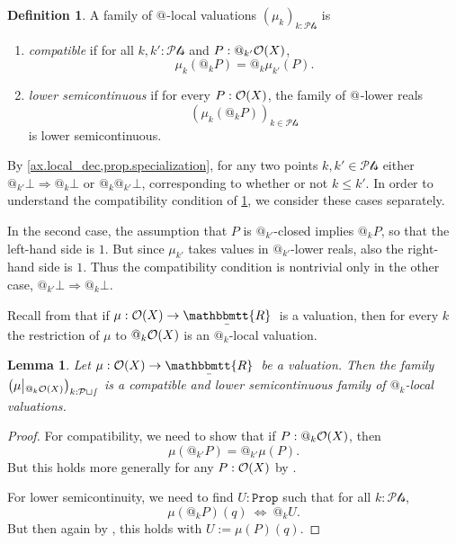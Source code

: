 \documentclass[11pt, oneside, article]{memoir}
\makeatletter
\theoremstyle{plain}
\newtheorem{lemma}[theorem]{Lemma}
\theoremstyle{definition}
\newtheorem{definition}[theorem]{Definition}
\theoremstyle{remark}
\newcommand{\const}[1]{\mathtt{#1}}
\newcommand{\ubar}[1]{\underaccent{\bar}{#1}}
\newcommand{\internal}[1]{\raisebox{-.03ex}{$\mathbbmtt{#1}$}}
\newcommand{\hs}{\hspace{1.1pt}}
\newcommand{\trr}{\internal{R}\hs}
\newcommand{\tlrr}{\ubar{\trr}\hs}
\newcommand{\prop}{\const{Prop}}
\newcommand{\Op}[1][undef]{\ifthenelse{\equal{#1}{undef}}{\mathcal{O}}{\mathcal{O}(#1)}}
\newcommand{\pt}{k}				%
\newcommand{\Pts}{\mathcal{Pts}}		%
\newcommand{\rest}[2]{#1\big|\hspace{0in}_{#2}}
\newcommand{\AtSymbol}{{@}}
\newcommand{\At}[1][\pt]{\AtSymbol_{#1}}
\newcommand{\imp}{\Rightarrow}
\newcommand{\false}{\bot}
\makeatother
\begin{document}
\begin{definition}\label{def.valuations_compatible_lowersemi}
	A family of $\At[]$-local valuations $(\mu_\pt)_{\pt : \Pts}$ is
	\begin{enumerate}
		\item \emph{compatible} if for all $\pt, \pt' : \Pts$ and $P : \At[\pt'] \Op[X]$,
			\[
				\mu_{\pt}(\At[\pt] P) = \At[\pt] \mu_{\pt'}(P).
			\]
		\item \emph{lower semicontinuous} if for every $P : \Op[X]$, the family of $\At[]$-lower reals
			\[
				\left( \mu_\pt(\At P) \right)_{k\in\Pts}
			\]
			is lower semicontinuous.
	\end{enumerate}
\end{definition}

By \cref{ax.local_dec,prop.specialization}, for any two points $\pt,\pt'\in\Pts$ either $\At[\pt']\false\imp\At[\pt]\false$ or $\At[\pt]\At[\pt']\false$, corresponding to whether or not $\pt\leq\pt'$. In order to understand the compatibility condition of \cref{def.valuations_compatible_lowersemi}, we consider these cases separately. 

In the second case, the assumption that $P$ is $\At[\pt']$-closed implies $\At[\pt] P$, so that the left-hand side is $1$. But since $\mu_{\pt'}$ takes values in $\At[\pt']$-lower reals, also the right-hand side is $1$. Thus the compatibility condition is nontrivial only in the other case, $\At[\pt'] \bot \imp \At[\pt] \bot$.

Recall from  that if $\mu : \Op[X] \to \tlrr$ is a valuation, then for every $\pt$ the restriction of $\mu$ to $\At \Op[X]$ is an $\At$-local valuation. 

\begin{lemma}\label{lemma.val_rests_compat_lowersemi}
	Let $\mu : \Op[X] \to \tlrr$ be a valuation. Then the family $\left( \rest{\mu}{\At \Op[X]} \right)_{\pt : \Pts}$ is a compatible and lower semicontinuous family of $\At$-local valuations.
\end{lemma}

\begin{proof}
	For compatibility, we need to show that if $P : \At \Op[X]$, then
	\[
		\mu( \At[\pt'] P ) = \At[\pt'] \mu(P).
	\]
	But this holds more generally for any $P:\Op[X]$ by .

	For lower semicontinuity, we need to find $U : \prop$ such that for all $\pt : \Pts$,
	\[
		\mu(\At P)(q) \: \Leftrightarrow \: \At U.
	\]
	But then again by , this holds with $U := \mu(P)(q)$.
\end{proof}
\end{document}
